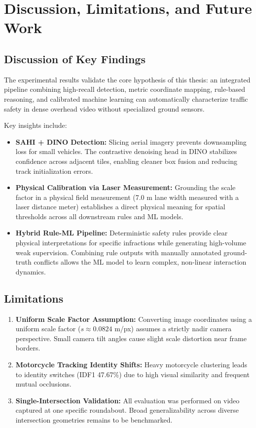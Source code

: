 \chapter{Discussion, Limitations, and Future Work}
\label{chap:discussion}

\section{Discussion of Key Findings}

The experimental results validate the core hypothesis of this thesis: an integrated pipeline combining high-recall
detection, metric coordinate mapping, rule-based reasoning, and calibrated machine learning can automatically
characterize traffic safety in dense overhead video without specialized ground sensors.

Key insights include:
\begin{itemize}
    \item \textbf{SAHI + DINO Detection:} Slicing aerial imagery prevents downsampling loss for small vehicles.
          The contrastive denoising head in DINO stabilizes confidence across adjacent tiles, enabling cleaner
          box fusion and reducing track initialization errors.
    \item \textbf{Physical Calibration via Laser Measurement:} Grounding the scale factor in a physical field measurement
          (7.0 m lane width measured with a laser distance meter) establishes a direct physical meaning for spatial
          thresholds across all downstream rules and ML models.
    \item \textbf{Hybrid Rule-ML Pipeline:} Deterministic safety rules provide clear physical interpretations for
          specific infractions while generating high-volume weak supervision. Combining rule outputs with manually
          annotated ground-truth conflicts allows the ML model to learn complex, non-linear interaction dynamics.
\end{itemize}

\section{Limitations}

\begin{enumerate}
    \item \textbf{Uniform Scale Factor Assumption:} Converting image coordinates using a uniform scale factor
          ($s \approx 0.0824$ m/px) assumes a strictly nadir camera perspective. Small camera tilt angles cause slight
          scale distortion near frame borders.
    \item \textbf{Motorcycle Tracking Identity Shifts:} Heavy motorcycle clustering leads to identity switches (IDF1 47.67\%)
          due to high visual similarity and frequent mutual occlusions.
    \item \textbf{Single-Intersection Validation:} All evaluation was performed on video captured at one specific
          roundabout. Broad generalizability across diverse intersection geometries remains to be benchmarked.
\end{enumerate}

